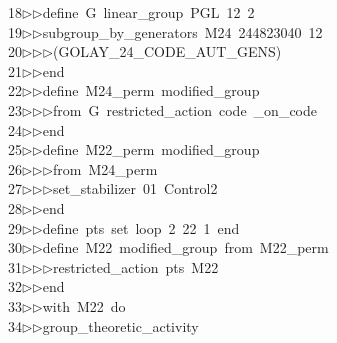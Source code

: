\begin{tabbing}
18\>$\triangleright$\>$\triangleright$\>define\ G\ linear\_group\ PGL\ 12\ 2\ \\[0pt]
19\>$\triangleright$\>$\triangleright$\>subgroup\_by\_generators\ M24\ 244823040\ 12\ \\[0pt]
20\>$\triangleright$\>$\triangleright$\>$\triangleright$\>(GOLAY\_24\_CODE\_AUT\_GENS)\ \\[0pt]
21\>$\triangleright$\>$\triangleright$\>end\ \\[0pt]
22\>$\triangleright$\>$\triangleright$\>define\ M24\_perm\ modified\_group\ \\[0pt]
23\>$\triangleright$\>$\triangleright$\>$\triangleright$\>from\ G\ restricted\_action\ code\ \_on\_code\ \\[0pt]
24\>$\triangleright$\>$\triangleright$\>end\ \\[0pt]
25\>$\triangleright$\>$\triangleright$\>define\ M22\_perm\ modified\_group\ \\[0pt]
26\>$\triangleright$\>$\triangleright$\>$\triangleright$\>from\ M24\_perm\ \\[0pt]
27\>$\triangleright$\>$\triangleright$\>$\triangleright$\>set\_stabilizer\ 01\ Control2\ \\[0pt]
28\>$\triangleright$\>$\triangleright$\>end\ \\[0pt]
29\>$\triangleright$\>$\triangleright$\>define\ pts\ set\ loop\ 2\ 22\ 1\ end\ \\[0pt]
30\>$\triangleright$\>$\triangleright$\>define\ M22\ modified\_group\ from\ M22\_perm\ \\[0pt]
31\>$\triangleright$\>$\triangleright$\>$\triangleright$\>restricted\_action\ pts\ M22\ \\[0pt]
32\>$\triangleright$\>$\triangleright$\>end\ \\[0pt]
33\>$\triangleright$\>$\triangleright$\>with\ M22\ do\ \\[0pt]
34\>$\triangleright$\>$\triangleright$\>group\_theoretic\_activity\ \\[0pt]

\end{tabbing}
